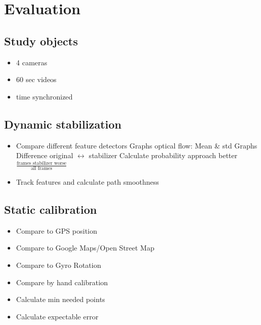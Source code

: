 \section{Evaluation}
\subsection{Study objects}
    \begin{itemize}
        \item 4 cameras
        \item 60 sec videos
        \item time synchronized
    \end{itemize}
\subsection{Dynamic stabilization}
\begin{itemize}
    \item Compare different feature detectors
    \subitem Graphs optical flow: Mean \& std
    \subitem Graphs Difference original $\leftrightarrow$  stabilizer
    \subitem Calculate probability approach better $\frac{\text{frames stabilizer worse}}{\text{all frames}}$
    \item Track features and calculate path smoothness
\end{itemize}
\subsection{Static calibration}
\begin{itemize}
    \item Compare to GPS position
    \item Compare to Google Maps/Open Street Map
    \item Compare to Gyro Rotation
    \item Compare by hand calibration
    \item Calculate min needed points
    \item Calculate expectable error
\end{itemize}